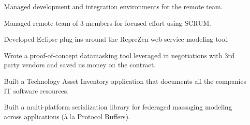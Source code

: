\documentclass[letterpaper]{deedy-resume} %
\begin{document}
\begin{minipage}[t]{0.66\textwidth}
\sectionspace %



\begin{tightitemize}
\item Managed development and integration environments for the remote team.
\item Managed remote team of 3 members for focused effort using SCRUM.
\item Developed Eclipse plug-ins around the RepreZen web service modeling tool.
\end{tightitemize}

\sectionspace %



\begin{tightitemize}
\item Wrote a proof-of-concept datamasking tool leveraged in negotiations with 3rd party vendors and saved
us money on the contract.
\item Built a Technology Asset Inventory application that documents all the companies IT software resources. 
\item Built a multi-platform serialization library for federaged massaging modeling across applications 
(à la Protocol Buffers).
\end{tightitemize}

\sectionspace %




\sectionspace %




\sectionspace %


\end{minipage}
\end{document}
